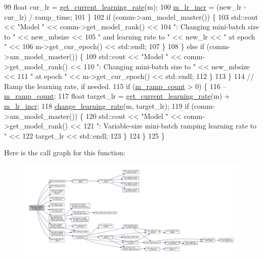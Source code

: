 \begin{DoxyCode}
99         \textcolor{keywordtype}{float} cur\_lr = \hyperlink{classlbann_1_1lbann__callback__variable__minibatch_a9de892c44231eadbbc7d27cfcc340ce2}{get\_current\_learning\_rate}(m);
100         \hyperlink{classlbann_1_1lbann__callback__variable__minibatch_ac78d3d357e1c16b3303cf358aee8a83d}{m\_lr\_incr} = (new\_lr - cur\_lr) / ramp\_time;
101       \}
102       \textcolor{keywordflow}{if} (comm->am\_model\_master()) \{
103         std::cout << \textcolor{stringliteral}{"Model "} << comm->get\_model\_rank() <<
104           \textcolor{stringliteral}{": Changing mini-batch size to "} << new\_mbsize <<
105           \textcolor{stringliteral}{" and learning rate to "} << new\_lr << \textcolor{stringliteral}{" at epoch "} <<
106           m->get\_cur\_epoch() << std::endl;
107       \}
108     \} \textcolor{keywordflow}{else} \textcolor{keywordflow}{if} (comm->am\_model\_master()) \{
109       std::cout << \textcolor{stringliteral}{"Model "} << comm->get\_model\_rank() <<
110         \textcolor{stringliteral}{": Changing mini-batch size to "} << new\_mbsize <<
111         \textcolor{stringliteral}{" at epoch "} << m->get\_cur\_epoch() << std::endl;
112     \}
113   \}
114   \textcolor{comment}{// Ramp the learning rate, if needed.}
115   \textcolor{keywordflow}{if} (\hyperlink{classlbann_1_1lbann__callback__variable__minibatch_a7beea78ef7107c88cb8782d3af618117}{m\_ramp\_count} > 0) \{
116     --\hyperlink{classlbann_1_1lbann__callback__variable__minibatch_a7beea78ef7107c88cb8782d3af618117}{m\_ramp\_count};
117     \textcolor{keywordtype}{float} target\_lr = \hyperlink{classlbann_1_1lbann__callback__variable__minibatch_a9de892c44231eadbbc7d27cfcc340ce2}{get\_current\_learning\_rate}(m) + 
      \hyperlink{classlbann_1_1lbann__callback__variable__minibatch_ac78d3d357e1c16b3303cf358aee8a83d}{m\_lr\_incr};
118     \hyperlink{classlbann_1_1lbann__callback__variable__minibatch_af078f30f9c206b89bdd542ce1fc6d2ad}{change\_learning\_rate}(m, target\_lr);
119     \textcolor{keywordflow}{if} (comm->am\_model\_master()) \{
120       std::cout << \textcolor{stringliteral}{"Model "} << comm->get\_model\_rank() <<
121         \textcolor{stringliteral}{": Variable-size mini-batch ramping learning rate to "} <<
122         target\_lr << std::endl;
123     \}
124   \}
125 \}
\end{DoxyCode}
Here is the call graph for this function\+:\nopagebreak
\begin{figure}[H]
\begin{center}
\leavevmode
\includegraphics[width=350pt]{classlbann_1_1lbann__callback__variable__minibatch_a091e7563b5a7a90638e2521fe39cbf8f_cgraph}
\end{center}
\end{figure}
